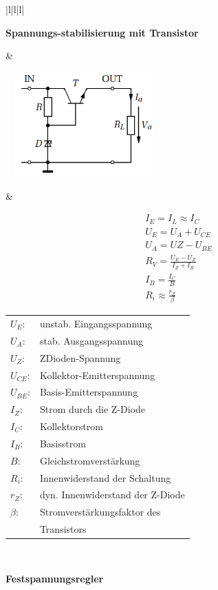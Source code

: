 \begin{longtable}{|l|l|l|}
\hline
\begin{minipage}{4cm}
\textbf{Spannungs-stabilisierung mit Transistor} 
\end{minipage}
&
\begin{minipage}{6cm}
\includegraphics[width=6cm, height =
4cm]{pictures/transistorStabilisierung}
\end{minipage}
&
\begin{minipage}{8cm}
\begin{gather}
I_{E}=I_{L}\approx I_{C}\\
U_{E}=U_{A}+U_{CE}\\
U_{A}=U{Z}-U_{BE}\\
R_{V}=\frac{U_{E}-U_{Z}}{I_{Z}+I_{B}}\\
I_{B}=\frac{I_{C}}{B}\\
R_{i}\approx\frac{r_{Z}}{\beta} 
\end{gather}
\begin{tabular}{ll}
$U_{E}$:&unstab. Eingangsspannung\\
$U_{A}$:&stab. Ausgangsspannung\\
$U_{Z}$:&ZDioden-Spannung\\
$U_{CE}$:&Kollektor-Emitterspannung\\
$U_{BE}$:&Basis-Emitterspannung\\
$I_{Z}$:&Strom durch die Z-Diode\\
$I_{C}$:&Kollektorstrom\\
$I_{B}$:&Basisstrom\\
$B$:&Gleichstromverstärkung\\
$R_{i}$:&Innenwiderstand der Schaltung\\
$r_{Z}$:&dyn. Innenwiderstand der Z-Diode\\
$\beta$:&Stromverstärkungsfaktor des \\&Transistors
\end{tabular}
\end{minipage}
\\
\hline
\begin{minipage}{4cm}
\textbf{Festspannungsregler} 

\end{minipage}
\end{longtable}
